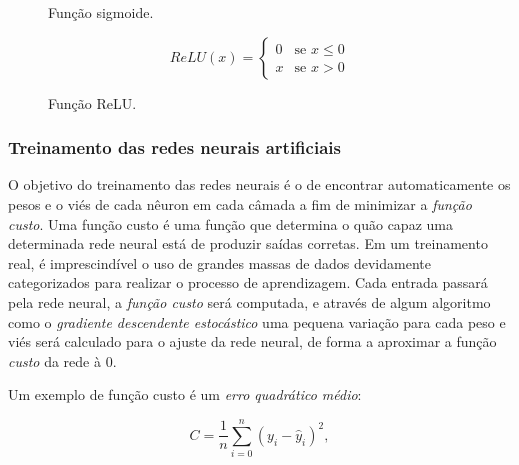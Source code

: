 \documentclass[12pt, a4paper]{article}
\begin{document}
\begin{figure}[H]
	\centering
	\caption{Função sigmoide.}
\end{figure}

\begin{equation}
ReLU(x) =
	\begin{cases}
		0 & \text{se } x \leq 0 \\
		x & \text{se } x > 0
	\end{cases}
\end{equation}

\begin{figure}[H]
	\centering
	\caption{Função ReLU.}
\end{figure}

\subsubsection{Treinamento das redes neurais artificiais}
O objetivo do treinamento das redes neurais é o de encontrar automaticamente os pesos e o viés de cada nêuron em cada câmada a fim de minimizar a \emph{função custo}. Uma função custo é uma função que determina o quão capaz uma determinada rede neural está de produzir saídas corretas. Em um treinamento real, é imprescindível o uso de grandes massas de dados devidamente categorizados para realizar o processo de aprendizagem. Cada entrada passará pela rede neural, a \emph{função custo} será computada, e através de algum algoritmo como o \emph{gradiente descendente estocástico} uma pequena variação para cada peso e viés será calculado para o ajuste da rede neural, de forma a aproximar a função \emph{custo} da rede à $0$.

Um exemplo de função custo é um \emph{erro quadrático médio}:

\begin{equation}
C = \frac{1}{n} \displaystyle\sum_{i=0}^{n} (y_i - \hat{y}_i)^2,
\end{equation}
\end{document}
